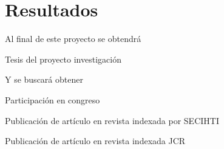 \section{Resultados}

Al final de este proyecto se obtendrá

\begin{listaflor}
  \item Tesis del proyecto investigación
\end{listaflor}

Y se buscará obtener

\begin{listaflor}
\item Participación en congreso
\item Publicación de artículo en revista indexada por SECIHTI
\item Publicación de artículo en revista indexada JCR
\end{listaflor}
